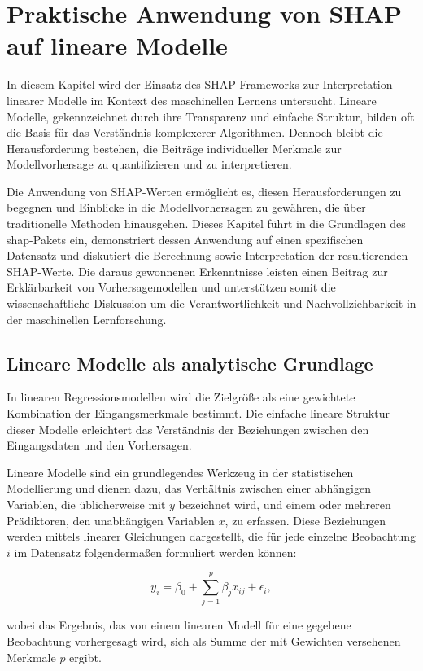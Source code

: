 \chapter{Praktische Anwendung von \acs{SHAP} auf lineare Modelle}

In diesem Kapitel wird der Einsatz des \acs{SHAP}-Frameworks zur Interpretation linearer Modelle im 
Kontext des maschinellen Lernens untersucht. Lineare Modelle, gekennzeichnet durch ihre Transparenz 
und einfache Struktur, bilden oft die Basis für das Verständnis komplexerer Algorithmen. 
Dennoch bleibt die Herausforderung bestehen, die Beiträge individueller Merkmale zur Modellvorhersage zu 
quantifizieren und zu interpretieren.

Die Anwendung von \acs{SHAP}-Werten ermöglicht es, diesen Herausforderungen zu begegnen und Einblicke in 
die Modellvorhersagen zu gewähren, die über traditionelle Methoden hinausgehen. 
Dieses Kapitel führt in die Grundlagen des \textsf{shap}-Pakets ein, demonstriert dessen Anwendung auf einen 
spezifischen Datensatz und diskutiert die Berechnung sowie Interpretation der resultierenden \acs{SHAP}-Werte. 
Die daraus gewonnenen Erkenntnisse leisten einen Beitrag zur Erklärbarkeit von Vorhersagemodellen und 
unterstützen somit die wissenschaftliche Diskussion um die Verantwortlichkeit und Nachvollziehbarkeit 
in der maschinellen Lernforschung.

\section{Lineare Modelle als analytische Grundlage}

In linearen Regressionsmodellen wird die Zielgröße als eine gewichtete Kombination der Eingangsmerkmale bestimmt. 
Die einfache lineare Struktur dieser Modelle erleichtert das Verständnis der Beziehungen zwischen den Eingangsdaten 
und den Vorhersagen. 

Lineare Modelle sind ein grundlegendes Werkzeug in der statistischen Modellierung und dienen dazu, das Verhältnis zwischen 
einer abhängigen Variablen, die üblicherweise mit $y$ bezeichnet wird, 
und einem oder mehreren Prädiktoren, den unabhängigen Variablen $x$, zu erfassen. 
Diese Beziehungen werden mittels linearer Gleichungen dargestellt, die für jede 
einzelne Beobachtung $i$ im Datensatz folgendermaßen formuliert werden können:

\[
    y_i = \beta_0 + \sum_{j=1}^{p} \beta_j x_{ij} + \epsilon_i,
\]

wobei das Ergebnis, das von einem linearen Modell für eine gegebene Beobachtung vorhergesagt wird, sich als Summe der mit 
Gewichten versehenen Merkmale $p$ ergibt.


